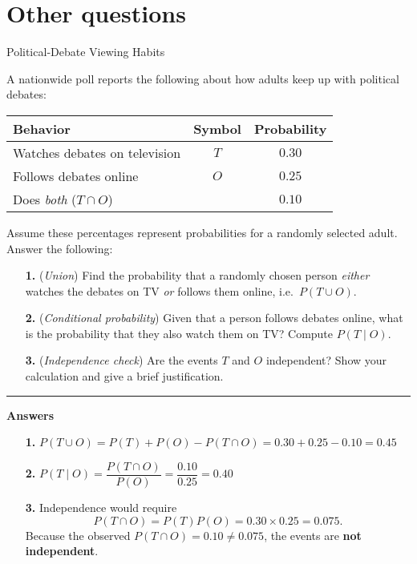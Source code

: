 \documentclass{article}
\begin{document}
\section*{Other questions}

Political‐Debate Viewing Habits

A nationwide poll reports the following about how adults keep up with political debates:

\begin{center}
\begin{tabular}{lcc}
\toprule
\textbf{Behavior} & \textbf{Symbol} & \textbf{Probability} \\ \midrule
Watches debates on television & $T$ & $0.30$ \\
Follows debates online        & $O$ & $0.25$ \\
Does \emph{both} ($T\cap O$)   &  & $0.10$ \\ \bottomrule
\end{tabular}
\end{center}

Assume these percentages represent probabilities for a randomly selected adult.  Answer the following:

\begin{enumerate}
  \item[\textbf{1.}] (\emph{Union})\; Find the probability that a randomly chosen person \emph{either} watches the debates on TV \emph{or} follows them online, i.e.\ $P(T\cup O)$.
  \item[\textbf{2.}] (\emph{Conditional probability})\; Given that a person follows debates online, what is the probability that they also watch them on TV?  Compute $P(T \mid O)$.
  \item[\textbf{3.}] (\emph{Independence check})\; Are the events $T$ and $O$ independent?  Show your calculation and give a brief justification.
\end{enumerate}

\vspace{1em}
\hrule
\vspace{1em}

\textbf{Answers}

\begin{enumerate}
  \item[\textbf{1.}] $P(T\cup O)=P(T)+P(O)-P(T\cap O)=0.30+0.25-0.10=0.45$
  \item[\textbf{2.}] $P(T\mid O)=\dfrac{P(T\cap O)}{P(O)}=\dfrac{0.10}{0.25}=0.40$
  \item[\textbf{3.}] Independence would require
    \[
      P(T\cap O)=P(T)P(O)=0.30\times 0.25=0.075.
    \]
    Because the observed $P(T\cap O)=0.10\neq 0.075$, the events are \textbf{not independent}.
\end{enumerate}
\end{document}

